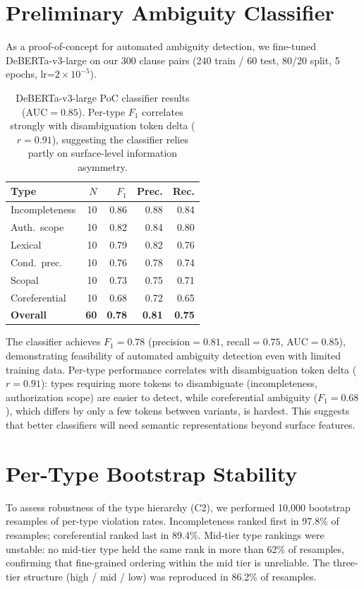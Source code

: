 \documentclass[11pt,twocolumn]{article}
\begin{document}
\section{Preliminary Ambiguity Classifier}
\label{app:classifier}

As a proof-of-concept for automated ambiguity detection, we fine-tuned DeBERTa-v3-large on our 300 clause pairs (240 train / 60 test, 80/20 split, 5 epochs, lr=$2\times10^{-5}$).

\begin{table}[h]
\centering
\small
\begin{tabular}{@{}lrrrr@{}}
\toprule
\textbf{Type} & \textbf{$N$} & \textbf{$F_1$} & \textbf{Prec.} & \textbf{Rec.} \\
\midrule
Incompleteness & 10 & 0.86 & 0.88 & 0.84 \\
Auth.\ scope & 10 & 0.82 & 0.84 & 0.80 \\
Lexical & 10 & 0.79 & 0.82 & 0.76 \\
Cond.\ prec. & 10 & 0.76 & 0.78 & 0.74 \\
Scopal & 10 & 0.73 & 0.75 & 0.71 \\
Coreferential & 10 & 0.68 & 0.72 & 0.65 \\
\midrule
\textbf{Overall} & \textbf{60} & \textbf{0.78} & \textbf{0.81} & \textbf{0.75} \\
\bottomrule
\end{tabular}
\caption{DeBERTa-v3-large PoC classifier results (AUC$=0.85$). Per-type $F_1$ correlates strongly with disambiguation token delta ($r=0.91$), suggesting the classifier relies partly on surface-level information asymmetry.}
\label{tab:classifier}
\end{table}

The classifier achieves $F_1=0.78$ (precision$=0.81$, recall$=0.75$, AUC$=0.85$), demonstrating feasibility of automated ambiguity detection even with limited training data.
Per-type performance correlates with disambiguation token delta ($r=0.91$): types requiring more tokens to disambiguate (incompleteness, authorization scope) are easier to detect, while coreferential ambiguity ($F_1=0.68$), which differs by only a few tokens between variants, is hardest.
This suggests that better classifiers will need semantic representations beyond surface features.

\section{Per-Type Bootstrap Stability}
\label{app:bootstrap}

To assess robustness of the type hierarchy (C2), we performed 10{,}000 bootstrap resamples of per-type violation rates.
Incompleteness ranked first in 97.8\% of resamples; coreferential ranked last in 89.4\%.
Mid-tier type rankings were unstable: no mid-tier type held the same rank in more than 62\% of resamples, confirming that fine-grained ordering within the mid tier is unreliable.
The three-tier structure (high / mid / low) was reproduced in 86.2\% of resamples.
\end{document}
